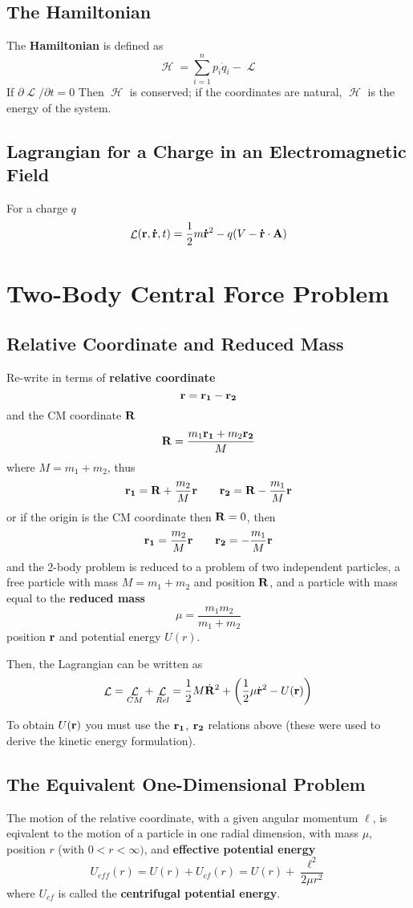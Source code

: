 \documentclass{article}
\DeclareMathOperator{\Lagr}{\mathcal{L}}
\DeclareMathOperator{\Ham}{\mathcal{H}}
\begin{document}
\subsection*{The Hamiltonian}
The \textbf{Hamiltonian} is defined as 
$$
\Ham = \sum_{i=1}^{n} p_i \dot q_i - \Lagr
$$
If $\partial \Lagr / \partial t = 0$ Then $\Ham$ is conserved; if the coordinates are natural, $\Ham$ is the energy of the system.

\subsection*{Lagrangian for a Charge in an Electromagnetic Field}
For a charge $q$
$$
\Lagr(\vb{r}, \vb{\dot r}, t) = \frac{1}{2} m \vb{\dot r}^2 - q(V - \vb{\dot r} \cdot \vb{A})
$$

\section{Two-Body Central Force Problem}
\subsection*{Relative Coordinate and Reduced Mass}
Re-write in terms of \textbf{relative coordinate}
$$
\vb{r} = \vb{r_1} - \vb{r_2}
$$
and the CM coordinate $\vb{R}$
$$
\vb{R} = \frac{m_1 \vb{r_1} + m_2 \vb{r_2}}{M}
$$
where $M = m_1 + m_2$, thus
$$
\vb{r_1} = \vb{R} + \frac{m_2}{M}\vb{r} \qquad \vb{r_2} = \vb{R} - \frac{m_1}{M}\vb{r}
$$
or if the origin is the CM coordinate then $\vb{R} = 0$, then
$$
\vb{r_1}  = \frac{m_2}{M}\vb{r} \qquad \vb{r_2} = -\frac{m_1}{M}\vb{r}
$$
and the 2-body problem is reduced to a problem of two independent particles, a free particle with mass $M = m_1 + m_2$ and position $\vb{R}$, and a particle with mass equal to the \textbf{reduced mass}
$$
\mu = \frac{m_1  m_2}{m_1 + m_2}
$$
position $\vb{r}$ and potential energy $U(r)$.

Then, the Lagrangian can be written as
$$
\Lagr = \Lagr_{CM} + \Lagr_{Rel} = \frac{1}{2}M\dot{\vb{R}}^2 + \left( \frac{1}{2}\mu \dot{\vb{r}}^2 - U(\vb{r})\right)
$$

To obtain $U(\vb{r})$ you must use the $\vb{r_1}$, $\vb{r_2}$ relations above (these were used to derive the kinetic energy formulation).


\subsection*{The Equivalent One-Dimensional Problem}
The motion of the relative coordinate, with a given angular momentum $\ell$, is eqivalent to the motion of a particle in one radial dimension, with mass $\mu$, position $r$ (with $0 < r < \infty)$, and \textbf{effective potential energy}
$$
U_{eff}(r) = U(r) + U_{cf}(r) = U(r) + \frac{\ell^2}{2\mu r^2}
$$
where $U_{cf}$ is called the \textbf{centrifugal potential energy}.
\end{document}
